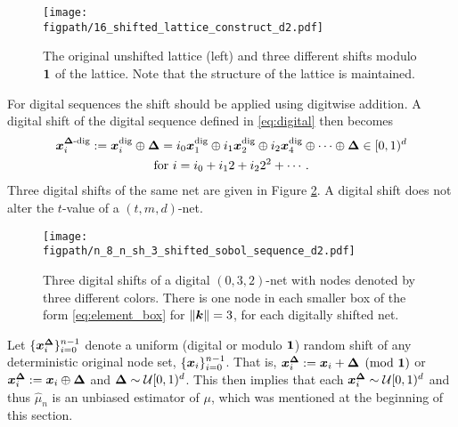 \documentclass{svproc}
\newcommand{\figpath}{Figures}
\begin{document}
\begin{figure}
	\centering
	\texttt{[image: \\figpath/16\_shifted\_lattice\_construct\_d2.pdf]}
	\caption{The original unshifted lattice (left) and three different shifts modulo ${\boldsymbol{1}}$ of the lattice.  Note that the structure of the lattice is maintained. \label{fig:shift_lat}}
\end{figure}

For digital sequences the shift should be applied using digitwise addition.  A digital shift of the digital sequence defined in  \eqref{eq:digital} then becomes
\begin{multline} \label{eq:sh_digital}
	{\boldsymbol{x}}_i^{{\boldsymbol{\Delta}}\text{-dig}} := {\boldsymbol{x}}_i^{\text{dig}} \oplus {\boldsymbol{\Delta}} = i_0 {\boldsymbol{x}}^{\text{dig}}_1 \oplus i_1 {\boldsymbol{x}}^{\text{dig}}_2 \oplus i_2 {\boldsymbol{x}}^{\text{dig}}_4 \oplus \cdots \oplus {\boldsymbol{\Delta}} \in [0,1)^d \\
    \text{for }
	i = i_0 + i_12 + i_2 2^2 + \cdots.
\end{multline}
Three digital shifts of the same net are given in Figure \ref{fig:shift_net}.  A digital shift does not alter the $t$-value of a $(t,m,d)$-net.

\begin{figure}
	\centering
	\texttt{[image: \\figpath/n\_8\_n\_sh\_3\_shifted\_sobol\_sequence\_d2.pdf]}
	\caption{Three digital shifts of a digital $(0,3,2)$-net with nodes denoted by three different colors.  There is one node in each smaller box of the form \eqref{eq:element_box} for $\lVert {\boldsymbol{k}} \rVert = 3$, for each digitally shifted net. \label{fig:shift_net}}
\end{figure}

Let $\{{\boldsymbol{x}}_i^{{\boldsymbol{\Delta}}}\}_{i=0}^{n-1}$ denote a uniform (digital or modulo ${\boldsymbol{1}}$) random shift of any deterministic original node set, $\{{\boldsymbol{x}}_i \}_{i=0}^{n-1}$.  That is, ${\boldsymbol{x}}_i^{{\boldsymbol{\Delta}}} : = {\boldsymbol{x}}_i + {\boldsymbol{\Delta}} \pmod {{\boldsymbol{1}}}$ or  ${\boldsymbol{x}}_i^{{\boldsymbol{\Delta}}} : = {\boldsymbol{x}}_i \oplus {\boldsymbol{\Delta}}$ and ${\boldsymbol{\Delta}} \sim {\mathcal{U}}[0,1)^d$. This then implies that each ${\boldsymbol{x}}_i^{{\boldsymbol{\Delta}}} \sim {\mathcal{U}}[0,1)^d$ and thus $\hat{\mu}_n$ is an unbiased estimator of $\mu$, which was mentioned at the beginning of this section.
\end{document}
